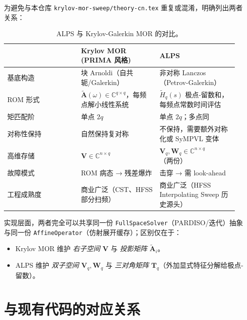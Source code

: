 \documentclass[11pt,a4paper]{ctexart}
\newcommand{\C}{\mathbb{C}}
\begin{document}
为避免与本仓库 \texttt{krylov-mor-sweep/theory-cn.tex} 重复或混淆，明确列出两者关系：

\begin{table}[h]
\centering
\begin{tabular}{p{0.3\linewidth}p{0.32\linewidth}p{0.32\linewidth}}
\toprule
& Krylov MOR (PRIMA 风格) & ALPS \\
\midrule
基底构造 & 块 Arnoldi（自共轭/Galerkin） & 非对称 Lanczos（Petrov-Galerkin） \\
ROM 形式 & $\widetilde{\bm A}(\omega)\in\C^{q\times q}$，每频点解小线性系统 & $\widetilde H_q(s)$ 极点-留数和，每频点常数时间评估 \\
矩匹配阶 & 单点 $2q$ & 单点 $2q$；多点同 \\
对称性保持 & 自然保持复对称 & 不保持，需要额外对称化或 SyMPVL 变体 \\
高维存储 & $\bm V\in\C^{n\times q}$ & $\bm V_q,\bm W_q\in\C^{n\times q}$（两份） \\
故障模式 & ROM 病态 → 残差爆炸 & 击穿 → 需 look-ahead \\
工程成熟度 & 商业广泛（CST、HFSS 部分扫频） & 商业广泛（HFSS Interpolating Sweep 历史源头） \\
\bottomrule
\end{tabular}
\caption{ALPS 与 Krylov-Galerkin MOR 的对比。}
\end{table}

实现层面，两者完全可以共享同一份 \texttt{FullSpaceSolver}（PARDISO/迭代）抽象与同一份 \texttt{AffineOperator}（仿射展开缓存）；区别仅在于：
\begin{itemize}
\item Krylov MOR 维护 \emph{右子空间 $\bm V$} 与 \emph{投影矩阵 $\widetilde{\bm A}_i$}。
\item ALPS 维护 \emph{双子空间 $\bm V_q,\bm W_q$} 与 \emph{三对角矩阵 $\bm T_q$}（外加显式特征分解给极点-留数）。
\end{itemize}

\section{与现有代码的对应关系}
\end{document}
